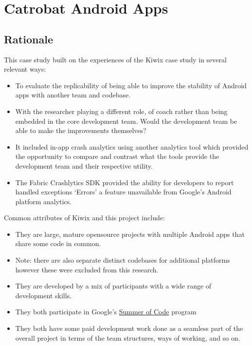 \section{Catrobat Android Apps}
\label{section-catrobat-case-study}

\subsection*{Rationale}

This case study built on the experiences of the Kiwix case study in several relevant ways:
\begin{itemize}
    \item To evaluate the replicability of being able to improve the stability of Android apps with another team and codebase.
    \item With the researcher playing a different role, of coach rather than being embedded in the core development team. Would the development team be able to make the improvements themselves?
    \item It included in-app crash analytics using another analytics tool which provided the opportunity to compare and contrast what the tools provide the development team and their respective utility. 
    \item The Fabric Crashlytics SDK provided the ability for developers to report handled exceptions `Errors' a feature unavailable from Google's Android platform analytics.
\end{itemize}

Common attributes of Kiwix and this project include:
\begin{itemize}
    \item They are large, mature opensource projects with multiple Android apps that share some code in common. 
    \item Note: there are also separate distinct codebases for additional platforms however these were excluded from this research.
    \item They are developed by a mix of participants with a wide range of development skills.
    \item They both participate in Google's \href{https://summerofcode.withgoogle.com/}{Summer of Code} program
    \item They both have some paid development work done as a seamless part of the overall project in terms of the team structures, ways of working, and so on.
\end{itemize}


